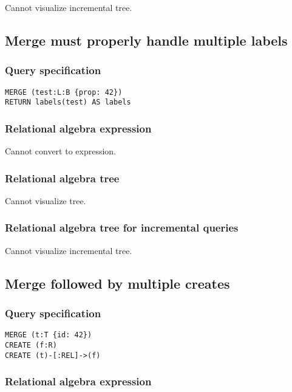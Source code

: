 Cannot visualize incremental tree.

\subsection{Merge must properly handle multiple labels}

\subsubsection*{Query specification}

\begin{lstlisting}
MERGE (test:L:B {prop: 42})
RETURN labels(test) AS labels
\end{lstlisting}

\subsubsection*{Relational algebra expression}

Cannot convert to expression.

\subsubsection*{Relational algebra tree}

Cannot visualize tree.

\subsubsection*{Relational algebra tree for incremental queries}

Cannot visualize incremental tree.

\subsection{Merge followed by multiple creates}

\subsubsection*{Query specification}

\begin{lstlisting}
MERGE (t:T {id: 42})
CREATE (f:R)
CREATE (t)-[:REL]->(f)
\end{lstlisting}

\subsubsection*{Relational algebra expression}


